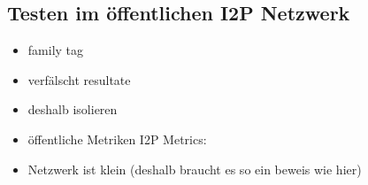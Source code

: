 \cite{timpanaro_monitoring_nodate}

\subsection{Testen im öffentlichen I2P Netzwerk}

\begin{itemize}
    \item family tag \cite{noauthor_family_nodate}
    \item verfälscht resultate
    \item deshalb isolieren
    \item öffentliche Metriken  I2P Metrics: \cite{noauthor_i2p_nodate-4}
    \item Netzwerk ist klein (deshalb braucht es so ein beweis wie hier)
\end{itemize}
